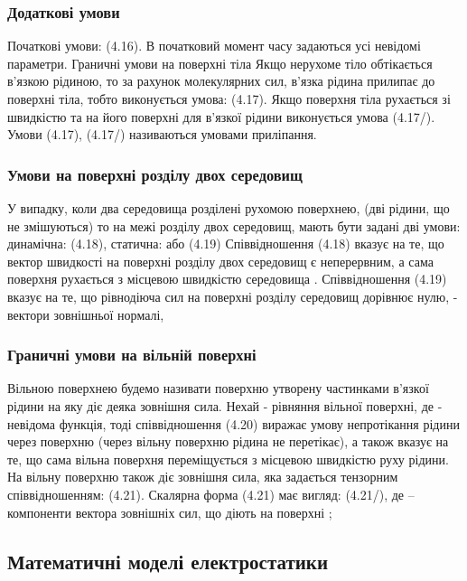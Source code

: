 \subsubsection{Додаткові умови}

Початкові умови:  				(4.16).
В початковий момент часу задаються усі невідомі параметри.
Граничні умови на поверхні тіла 
Якщо нерухоме тіло обтікається в'язкою рідиною, то за рахунок молекулярних сил, в'язка рідина прилипає до поверхні тіла, тобто виконується умова: 	  									(4.17). 
Якщо поверхня тіла рухається зі швидкістю   та на його поверхні для в'язкої рідини виконується умова 
 									(4.17/).
Умови (4.17), (4.17/) називаються умовами приліпання.

\subsubsection{Умови на поверхні розділу двох середовищ}

У випадку, коли два середовища розділені рухомою поверхнею, (дві рідини, що не змішуються) то на межі розділу двох середовищ, мають бути задані дві умови: 
динамічна:   							(4.18),
статична:   або	 	 		(4.19)
Співвідношення (4.18) вказує на те, що вектор швидкості на поверхні розділу двох середовищ є неперервним, а сама поверхня рухається з місцевою швидкістю середовища  . Співвідношення (4.19) вказує на те, що рівнодіюча сил на поверхні розділу середовищ дорівнює нулю,   - вектори зовнішньої нормалі,  

\subsubsection{Граничні умови на вільній поверхні}

Вільною поверхнею будемо називати поверхню утворену частинками в'язкої рідини на яку діє деяка зовнішня сила. Нехай   - рівняння вільної поверхні, де  - невідома функція, тоді співвідношення 
 									 (4.20) виражає умову непротікання рідини через поверхню (через вільну поверхню рідина не перетікає), а також вказує на те, що сама вільна поверхня переміщується з місцевою швидкістю руху рідини.
На вільну поверхню також діє зовнішня сила, яка задається тензорним співвідношенням:  							(4.21).
Скалярна форма (4.21) має вигляд: 
 						(4.21/),    де   – компоненти вектора зовнішніх сил, що діють на поверхні  ;

\subsection{Математичні моделі електростатики}

